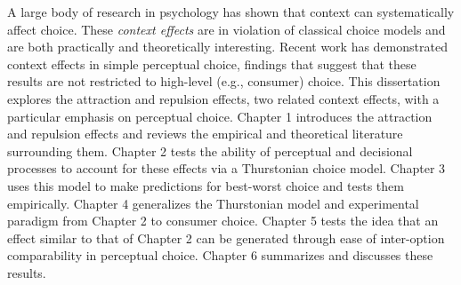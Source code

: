 A large body of research in psychology has shown that context can systematically affect choice. These \textit{context effects} are in violation of classical choice models and are both practically and theoretically interesting. Recent work has demonstrated context effects in simple perceptual choice,  findings that suggest that these results are not restricted to high-level (e.g., consumer) choice. This dissertation explores the attraction and repulsion effects, two related context effects, with a particular emphasis on perceptual choice. Chapter 1 introduces the attraction and repulsion effects and reviews the empirical and theoretical literature surrounding them. Chapter 2 tests the ability of perceptual and decisional processes to account for these effects via a Thurstonian choice model. Chapter 3 uses this model to make predictions for best-worst choice and tests them empirically. Chapter 4 generalizes the Thurstonian model and experimental paradigm from Chapter 2 to consumer choice. Chapter 5 tests the idea that an effect similar to that of Chapter 2 can be generated through ease of inter-option comparability in perceptual choice. Chapter 6 summarizes and discusses these results. 